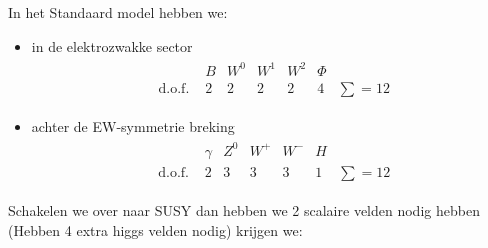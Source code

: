\documentclass[../main.tex]{subfiles}
\begin{document}
In het Standaard model hebben we:
\begin{itemize}
    \item in de elektrozwakke sector
        \begin{equation}
            \begin{aligned}
                \label{eq:susy_deeltjes_3}
                \begin{array}{lcccccc} 
                                        & B & W^{0} & W^{1} & W^{2} & \Phi  & \\
                    \text { d.o.f. }    & 2 & 2     & 2     & 2     & 4     & \sum=12
                \end{array}
            \end{aligned}
        \end{equation}
    \item achter de EW-symmetrie breking
        \begin{equation}
            \begin{aligned}
                \label{eq:susy_deeltjes_4}
                \begin{array}{lcccccc} 
                                        & \gamma & Z^{0} & W^{+} & W^{-} & H  & \\
                    \text { d.o.f. }    & 2 & 3     & 3     & 3     & 1     & \sum=12
                \end{array}
            \end{aligned}
        \end{equation}
\end{itemize}
Schakelen we over naar SUSY dan hebben we 2 scalaire velden nodig hebben (Hebben 4 extra higgs velden nodig) krijgen we:
\end{document}
